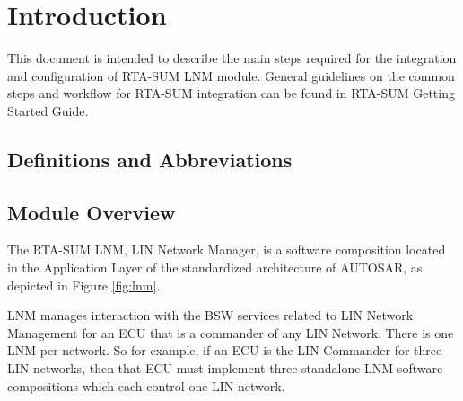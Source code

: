 \chapter{Introduction}

This document is intended to describe the main steps required for the integration and configuration of
RTA-SUM LNM module. 
\ifnum {}
{
General guidelines on the common steps and workflow for RTA-SUM integration can be found in RTA-SUM Getting Started Guide.
}
\else
{
}\fi

\section{Definitions and Abbreviations}
\label{section:Definitions}


\section{Module Overview}
\label{section:overview}
The RTA-SUM LNM, LIN Network Manager, is a software composition located in the Application Layer of the standardized architecture of AUTOSAR, as depicted in Figure \ref{fig:lnm}.


LNM manages interaction with the BSW services related to LIN Network Management for an ECU that is a commander of any LIN Network. There is one LNM per network. So for example, if an ECU is the LIN Commander for three LIN networks, then that ECU must implement three standalone LNM software compositions which each control one LIN network.



